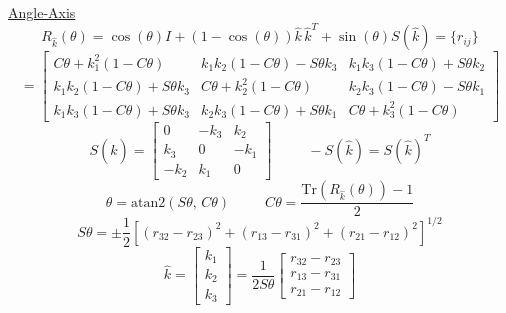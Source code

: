 \documentclass[twocolumn, 12pt]{article}    %
\begin{document}
\noindent \underline{Angle-Axis}
\begin{equation*}
    R_{\hat{k}}(\theta) = \cos(\theta)I + (1-\cos (\theta)) \hat{k}\, \hat{k}^T + \sin (\theta)S\left(\hat{k}\right) = \{r_{ij}\}
\end{equation*}
\begin{equation*}
    =\begin{bmatrix}
        C\theta +k_1^2(1-C\theta) & k_1k_2(1-C\theta) -S\theta k_3 & k_1k_3(1-C\theta) + S\theta k_2\\
        k_1k_2(1-C\theta) + S\theta k_3 & C\theta + k_2^2(1-C\theta) & k_2k_3(1-C\theta)-S\theta k_1 \\
        k_1k_3(1-C\theta)+S\theta k_3 & k_2k_3(1-C\theta) +S\theta k_1 & C\theta + k_3^2(1-C\theta)
    \end{bmatrix}
\end{equation*}
\begin{equation*}
    S\left( \hat{k}\right) = \begin{bmatrix}
        0 & -k_3 & k_2 \\
        k_3 & 0 & -k_1 \\
        -k_2 & k_1 & 0
    \end{bmatrix} \hspace{30pt} -S\left( \hat{k}\right) = S\left( \hat{k}\right)^T
\end{equation*}
\begin{equation*}
    \theta = \text{atan2}(S\theta,\, C\theta) \hspace{30pt} C\theta = \frac{\text{Tr} \left(R_{\hat{k}}(\theta) \right)-1}{2}
\end{equation*}
\begin{equation*}
    S\theta =  \pm \frac{1}{2} \left[(r_{32} - r_{23})^2 + (r_{13}-r_{31})^2 +(r_{21} -r_{12})^2 \right]^{1/2}
\end{equation*}
\begin{equation*}
    \hat{k} = \begin{bmatrix}
        k_1\\k_2\\k_3
    \end{bmatrix} =\frac{1}{2S\theta} \begin{bmatrix}
        r_{32} -r_{23}\\
        r_{13} -r_{31}\\
        r_{21} -r_{12}
    \end{bmatrix}
\end{equation*}
\end{document}
